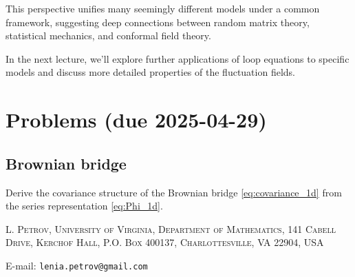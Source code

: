 \documentclass[letterpaper,11pt,oneside,reqno]{article}
\numberwithin{equation}{section}
\theoremstyle{definition}
\begin{document}
This perspective unifies many seemingly different models under a common framework, suggesting deep connections between random matrix theory, statistical mechanics, and conformal field theory.

In the next lecture, we'll explore further applications of loop equations to specific models and discuss more detailed properties of the fluctuation fields.



\appendix
\setcounter{section}{8}

\section{Problems (due 2025-04-29)}

\subsection{Brownian bridge}

Derive the covariance structure of the Brownian bridge
\eqref{eq:covariance_1d} from the series representation
\eqref{eq:Phi_1d}.







\medskip

\textsc{L. Petrov, University of Virginia, Department of Mathematics, 141 Cabell Drive, Kerchof Hall, P.O. Box 400137, Charlottesville, VA 22904, USA}

E-mail: \texttt{lenia.petrov@gmail.com}
\end{document}
